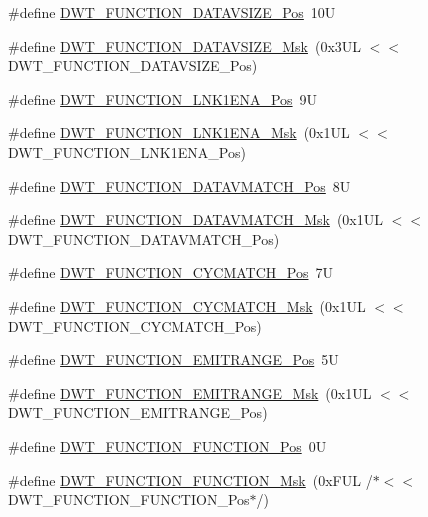 \begin{DoxyCompactItemize}
\item 
\#define \mbox{\hyperlink{group__CMSIS__DWT_ga0517a186d4d448aa6416440f40fe7a4d}{D\+W\+T\+\_\+\+F\+U\+N\+C\+T\+I\+O\+N\+\_\+\+D\+A\+T\+A\+V\+S\+I\+Z\+E\+\_\+\+Pos}}~10U
\item 
\#define \mbox{\hyperlink{group__CMSIS__DWT_gaab42cbc1e6084c44d5de70971613ea76}{D\+W\+T\+\_\+\+F\+U\+N\+C\+T\+I\+O\+N\+\_\+\+D\+A\+T\+A\+V\+S\+I\+Z\+E\+\_\+\+Msk}}~(0x3\+U\+L $<$$<$ D\+W\+T\+\_\+\+F\+U\+N\+C\+T\+I\+O\+N\+\_\+\+D\+A\+T\+A\+V\+S\+I\+Z\+E\+\_\+\+Pos)
\item 
\#define \mbox{\hyperlink{group__CMSIS__DWT_ga89d7c48858b4d4de96cdadfac91856a1}{D\+W\+T\+\_\+\+F\+U\+N\+C\+T\+I\+O\+N\+\_\+\+L\+N\+K1\+E\+N\+A\+\_\+\+Pos}}~9U
\item 
\#define \mbox{\hyperlink{group__CMSIS__DWT_ga64bd419260c3337cacf93607d1ad27ac}{D\+W\+T\+\_\+\+F\+U\+N\+C\+T\+I\+O\+N\+\_\+\+L\+N\+K1\+E\+N\+A\+\_\+\+Msk}}~(0x1\+U\+L $<$$<$ D\+W\+T\+\_\+\+F\+U\+N\+C\+T\+I\+O\+N\+\_\+\+L\+N\+K1\+E\+N\+A\+\_\+\+Pos)
\item 
\#define \mbox{\hyperlink{group__CMSIS__DWT_ga106f3672cd4be7c7c846e20497ebe5a6}{D\+W\+T\+\_\+\+F\+U\+N\+C\+T\+I\+O\+N\+\_\+\+D\+A\+T\+A\+V\+M\+A\+T\+C\+H\+\_\+\+Pos}}~8U
\item 
\#define \mbox{\hyperlink{group__CMSIS__DWT_ga32af1f1c0fcd2d8d9afd1ad79cd9970e}{D\+W\+T\+\_\+\+F\+U\+N\+C\+T\+I\+O\+N\+\_\+\+D\+A\+T\+A\+V\+M\+A\+T\+C\+H\+\_\+\+Msk}}~(0x1\+U\+L $<$$<$ D\+W\+T\+\_\+\+F\+U\+N\+C\+T\+I\+O\+N\+\_\+\+D\+A\+T\+A\+V\+M\+A\+T\+C\+H\+\_\+\+Pos)
\item 
\#define \mbox{\hyperlink{group__CMSIS__DWT_ga4b65d79ca37ae8010b4a726312413efd}{D\+W\+T\+\_\+\+F\+U\+N\+C\+T\+I\+O\+N\+\_\+\+C\+Y\+C\+M\+A\+T\+C\+H\+\_\+\+Pos}}~7U
\item 
\#define \mbox{\hyperlink{group__CMSIS__DWT_ga8e2ed09bdd33a8f7f7ce0444f5f3bb25}{D\+W\+T\+\_\+\+F\+U\+N\+C\+T\+I\+O\+N\+\_\+\+C\+Y\+C\+M\+A\+T\+C\+H\+\_\+\+Msk}}~(0x1\+U\+L $<$$<$ D\+W\+T\+\_\+\+F\+U\+N\+C\+T\+I\+O\+N\+\_\+\+C\+Y\+C\+M\+A\+T\+C\+H\+\_\+\+Pos)
\item 
\#define \mbox{\hyperlink{group__CMSIS__DWT_ga41d5b332216baa8d29561260a1b85659}{D\+W\+T\+\_\+\+F\+U\+N\+C\+T\+I\+O\+N\+\_\+\+E\+M\+I\+T\+R\+A\+N\+G\+E\+\_\+\+Pos}}~5U
\item 
\#define \mbox{\hyperlink{group__CMSIS__DWT_gad46dd5aba29f2e28d4d3f50b1d291f41}{D\+W\+T\+\_\+\+F\+U\+N\+C\+T\+I\+O\+N\+\_\+\+E\+M\+I\+T\+R\+A\+N\+G\+E\+\_\+\+Msk}}~(0x1\+U\+L $<$$<$ D\+W\+T\+\_\+\+F\+U\+N\+C\+T\+I\+O\+N\+\_\+\+E\+M\+I\+T\+R\+A\+N\+G\+E\+\_\+\+Pos)
\item 
\#define \mbox{\hyperlink{group__CMSIS__DWT_ga5797b556edde2bbaa4d33dcdb1a891bb}{D\+W\+T\+\_\+\+F\+U\+N\+C\+T\+I\+O\+N\+\_\+\+F\+U\+N\+C\+T\+I\+O\+N\+\_\+\+Pos}}~0U
\item 
\#define \mbox{\hyperlink{group__CMSIS__DWT_ga3b2cda708755ecf5f921d08b25d774d1}{D\+W\+T\+\_\+\+F\+U\+N\+C\+T\+I\+O\+N\+\_\+\+F\+U\+N\+C\+T\+I\+O\+N\+\_\+\+Msk}}~(0x\+F\+U\+L /$\ast$$<$$<$ D\+W\+T\+\_\+\+F\+U\+N\+C\+T\+I\+O\+N\+\_\+\+F\+U\+N\+C\+T\+I\+O\+N\+\_\+\+Pos$\ast$/)
\end{DoxyCompactItemize}


